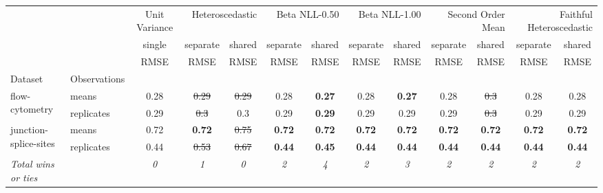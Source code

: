 \begin{tabular}{ll|c|cc|cc|cc|cc|cc}
\toprule
{} & {} & {Unit Variance} & \multicolumn{2}{r}{Heteroscedastic} & \multicolumn{2}{r}{Beta NLL-0.50} & \multicolumn{2}{r}{Beta NLL-1.00} & \multicolumn{2}{r}{Second Order Mean} & \multicolumn{2}{r}{Faithful Heteroscedastic} \\
{} & {} & {single} & {separate} & {shared} & {separate} & {shared} & {separate} & {shared} & {separate} & {shared} & {separate} & {shared} \\
{} & {} & {RMSE} & {RMSE} & {RMSE} & {RMSE} & {RMSE} & {RMSE} & {RMSE} & {RMSE} & {RMSE} & {RMSE} & {RMSE} \\
{Dataset} & {Observations} & {} & {} & {} & {} & {} & {} & {} & {} & {} & {} & {} \\
\midrule
\multirow[c]{2}{*}{flow-cytometry} & means & 0.28 & \sout{0.29} & \sout{0.29} & 0.28 & \textbf{0.27} & 0.28 & \textbf{0.27} & 0.28 & \sout{0.3} & 0.28 & 0.28 \\
 & replicates & 0.29 & \sout{0.3} & 0.3 & 0.29 & \textbf{0.29} & 0.29 & 0.29 & 0.29 & \sout{0.3} & 0.29 & 0.29 \\
\multirow[c]{2}{*}{junction-splice-sites} & means & 0.72 & \textbf{0.72} & \sout{0.75} & \textbf{0.72} & \textbf{0.72} & \textbf{0.72} & \textbf{0.72} & \textbf{0.72} & \textbf{0.72} & \textbf{0.72} & \textbf{0.72} \\
 & replicates & 0.44 & \sout{0.53} & \sout{0.67} & \textbf{0.44} & \textbf{0.45} & \textbf{0.44} & \textbf{0.44} & \textbf{0.44} & \textbf{0.44} & \textbf{0.44} & \textbf{0.44} \\
\textit{{Total wins or ties}} &  & \textit{0} & \textit{1} & \textit{0} & \textit{2} & \textit{4} & \textit{2} & \textit{3} & \textit{2} & \textit{2} & \textit{2} & \textit{2} \\
\bottomrule
\end{tabular}
